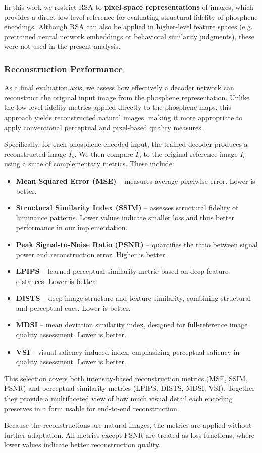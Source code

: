 In this work we restrict RSA to \textbf{pixel-space representations} of images, which provides a direct low-level reference for evaluating structural fidelity of phosphene encodings. Although RSA can also be applied in higher-level feature spaces (e.g. pretrained neural network embeddings or behavioral similarity judgments), these were not used in the present analysis.


\subsubsection{Reconstruction Performance}
As a final evaluation axis, we assess how effectively a decoder network can reconstruct the original input image from the phosphene representation. Unlike the low-level fidelity metrics applied directly to the phosphene maps, this approach yields reconstructed natural images, making it more appropriate to apply conventional perceptual and pixel-based quality measures.

Specifically, for each phosphene-encoded input, the trained decoder produces a reconstructed image \(\hat{I}_o\). We then compare \(\hat{I}_o\) to the original reference image \(I_o\) using a suite of complementary metrics. These include:

\begin{itemize}
    \item \textbf{Mean Squared Error (MSE)} – measures average pixelwise error. Lower is better.
    \item \textbf{Structural Similarity Index (SSIM)} – assesses structural fidelity of luminance patterns. Lower values indicate smaller loss and thus better performance in our implementation.
    \item \textbf{Peak Signal-to-Noise Ratio (PSNR)} – quantifies the ratio between signal power and reconstruction error. Higher is better.
    \item \textbf{LPIPS} – learned perceptual similarity metric based on deep feature distances. Lower is better.
    \item \textbf{DISTS} – deep image structure and texture similarity, combining structural and perceptual cues. Lower is better.
    \item \textbf{MDSI} – mean deviation similarity index, designed for full-reference image quality assessment. Lower is better.
    \item \textbf{VSI} – visual saliency-induced index, emphasizing perceptual saliency in quality assessment. Lower is better.
\end{itemize}

This selection covers both intensity-based reconstruction metrics (MSE, SSIM, PSNR) and perceptual similarity metrics (LPIPS, DISTS, MDSI, VSI). Together they provide a multifaceted view of how much visual detail each encoding preserves in a form usable for end-to-end reconstruction. 

Because the reconstructions are natural images, the metrics are applied without further adaptation. All metrics except PSNR are treated as loss functions, where lower values indicate better reconstruction quality.
